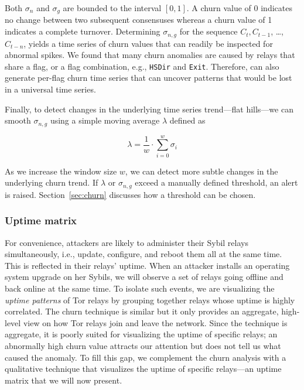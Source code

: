 Both $\sigma_{n}$ and $\sigma_{g}$ are bounded to the interval $[0, 1]$.  A
churn value of 0 indicates no change between two subsequent consensuses whereas
a churn value of 1 indicates a complete turnover.  Determining $\sigma_{n,g}$
for the sequence $C_{t}, C_{t-1}$, \ldots, $C_{t-n}$, yields a time series of
churn values that can readily be inspected for abnormal spikes.  We found that
many churn anomalies are caused by relays that share a flag, or a flag
combination, e.g., \texttt{HSDir} and \texttt{Exit}.  Therefore, \sys can
also generate per-flag churn time series that can uncover patterns that would be
lost in a universal time series.

Finally, to detect changes in the underlying time series trend---flat hills---we
can smooth $\sigma_{n,g}$ using a simple moving average $\lambda$ defined as

\begin{equation}
\lambda = \frac{1}{w} \cdot \sum_{i=0}^{w} \sigma_{i}
\end{equation}

As we increase the window size $w$, we can detect more subtle changes in the
underlying churn trend.  If $\lambda$ or $\sigma_{n,g}$ exceed a manually
defined threshold, an alert is raised.  Section~\ref{sec:churn} discusses how a
threshold can be chosen.

\subsubsection{Uptime matrix}
\label{sec:uptime-matrix}
For convenience, attackers are likely to administer their Sybil relays
simultaneously, i.e., update, configure, and reboot them all at the same time.
This is reflected in their relays' uptime.  When an attacker installs an
operating system upgrade on her Sybils, we will observe a set of relays going
offline and back online at the same time.  To isolate such events, we are
visualizing the \emph{uptime patterns} of Tor relays by grouping together relays
whose uptime is highly correlated.  The churn technique is similar but it only
provides an aggregate, high-level view on how Tor relays join and leave the
network.  Since the technique is aggregate, it is poorly suited for visualizing
the uptime of specific relays; an abnormally high churn value attracts our
attention but does not tell us what caused the anomaly.  To fill this gap, we
complement the churn analysis with a qualitative technique that visualizes the
uptime of specific relays---an uptime matrix that we will now present.

